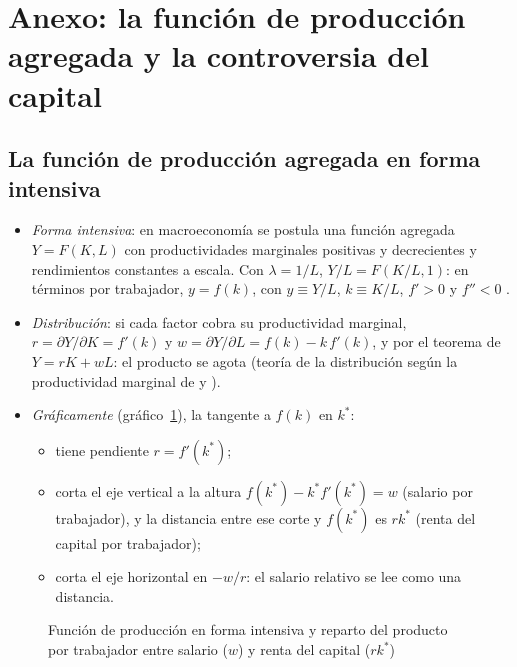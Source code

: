 \documentclass[11pt]{article}
\begin{document}
\section{Anexo: la función de producción agregada\cortetitulo{} y la controversia del capital}\label{anexo:cambridge}

\subsection{La función de producción agregada en forma intensiva}\label{anexo:funcion-produccion-agregada}

\begin{itemize}
\item \emph{Forma intensiva}: en macroeconomía se postula una función agregada $Y=F(K,L)$ con productividades marginales positivas y decrecientes y rendimientos constantes a escala. Con $\lambda=1/L$, $Y/L=F(K/L,1)$: en términos por trabajador, $y=f(k)$, con $y\equiv Y/L$, $k\equiv K/L$, $f'>0$ y $f''<0$ .
\item \emph{Distribución}: si cada factor cobra su productividad marginal, $r=\partial Y/\partial K=f'(k)$ y $w=\partial Y/\partial L=f(k)-k\,f'(k)$, y por el teorema de  $Y=rK+wL$: el producto se agota (teoría de la distribución según la productividad marginal de  y ).
\item \emph{Gráficamente} (gráfico~\ref{fig:forma-intensiva}), la tangente a $f(k)$ en $k^*$:
  \begin{itemize}
  \item tiene pendiente $r=f'(k^*)$;
  \item corta el eje vertical a la altura $f(k^*)-k^*f'(k^*)=w$ (salario por trabajador), y la distancia entre ese corte y $f(k^*)$ es $rk^*$ (renta del capital por trabajador);
  \item corta el eje horizontal en $-w/r$: el salario relativo se lee como una distancia.
  \end{itemize}
\end{itemize}

\begin{figure}[H]
\centering
\caption{Función de producción en forma intensiva y reparto del producto por trabajador entre salario ($w$) y renta del capital ($rk^*$)}\label{fig:forma-intensiva}
\end{figure}
\end{document}
